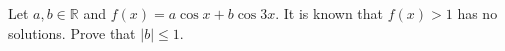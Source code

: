 Let $a, b \in \mathbb{R}$ and $f(x) = a\cos x + b\cos 3x$. It is known that $f(x) > 1$ has no solutions. Prove that $|b| \leq 1$.
